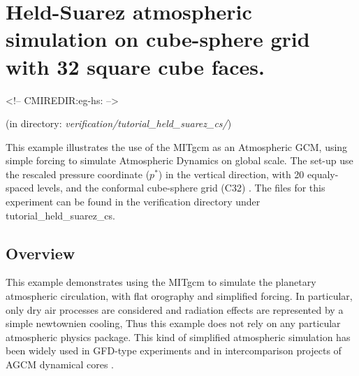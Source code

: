 
\section[Held-Suarez Atmosphere MITgcm Example]{Held-Suarez atmospheric simulation
on cube-sphere grid with 32 square cube faces.}
\label{www:tutorials}
\label{sect:eg-hs}
\begin{rawhtml}
<!-- CMIREDIR:eg-hs: -->
\end{rawhtml}
\begin{center}
(in directory: {\it verification/tutorial\_held\_suarez\_cs/})
\end{center}


%
%

This example illustrates the use of the MITgcm as an Atmospheric GCM,
using simple \cite{held-suar:94} forcing 
to simulate Atmospheric Dynamics on global scale.
The set-up use the rescaled pressure coordinate ($p^*$)\cite[]{adcroft:04a}
in the vertical direction, with 20 equaly-spaced levels, and
the conformal cube-sphere grid (C32) \cite[]{adcroft:04b}.
The files for this experiment can be found in the verification directory
under tutorial\_held\_suarez\_cs.

\subsection{Overview}
\label{www:tutorials}

This example demonstrates using the MITgcm to simulate
the planetary atmospheric circulation, with flat orography
and simplified forcing.
In particular, only dry air processes are considered and 
radiation effects are represented by a simple newtownien cooling,
Thus this example does not rely on any particular atmospheric 
physics package.
This kind of simplified atmospheric simulation has been widely 
used in GFD-type experiments and in intercomparison projects of 
AGCM dynamical cores \cite[]{held-suar:94}.

